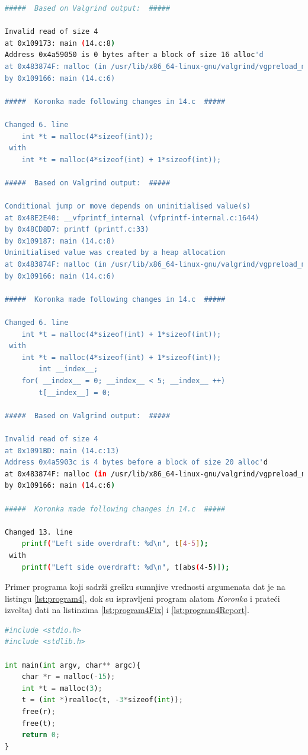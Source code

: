 \documentclass[12pt,oneside]{memoir}
\theoremstyle{plain}
\theoremstyle{definition}
\begin{document}
\begin{lstlisting}[style=terminal,caption={Izveštaj o radu alata \textit{Koronka} za program sa listinga \ref{lst:program3}}, label={lst:program3Report},language={bash}]   
#####  Based on Valgrind output:  #####

Invalid read of size 4
at 0x109173: main (14.c:8)
Address 0x4a59050 is 0 bytes after a block of size 16 alloc'd
at 0x483874F: malloc (in /usr/lib/x86_64-linux-gnu/valgrind/vgpreload_memcheck-amd64-linux.so)
by 0x109166: main (14.c:6)

#####  Koronka made following changes in 14.c  #####

Changed 6. line 
	int *t = malloc(4*sizeof(int));
 with 
	int *t = malloc(4*sizeof(int) + 1*sizeof(int));

#####  Based on Valgrind output:  #####

Conditional jump or move depends on uninitialised value(s)
at 0x48E2E40: __vfprintf_internal (vfprintf-internal.c:1644)
by 0x48CD8D7: printf (printf.c:33)
by 0x109187: main (14.c:8)
Uninitialised value was created by a heap allocation
at 0x483874F: malloc (in /usr/lib/x86_64-linux-gnu/valgrind/vgpreload_memcheck-amd64-linux.so)
by 0x109166: main (14.c:6)

#####  Koronka made following changes in 14.c  #####

Changed 6. line 
	int *t = malloc(4*sizeof(int) + 1*sizeof(int));
 with 
	int *t = malloc(4*sizeof(int) + 1*sizeof(int));
		int __index__;
	for( __index__ = 0; __index__ < 5; __index__ ++)
		t[__index__] = 0;

#####  Based on Valgrind output:  #####

Invalid read of size 4
at 0x1091BD: main (14.c:13)
Address 0x4a5903c is 4 bytes before a block of size 20 alloc'd
at 0x483874F: malloc (in /usr/lib/x86_64-linux-gnu/valgrind/vgpreload_memcheck-amd64-linux.so)
by 0x109166: main (14.c:6)

#####  Koronka made following changes in 14.c  #####

Changed 13. line 
	printf("Left side overdraft: %d\n", t[4-5]);
 with 
	printf("Left side overdraft: %d\n", t[abs(4-5)]);	
\end{lstlisting}

Primer programa koji sadrži grešku sumnjive vrednosti argumenata dat je na listingu \ref{lst:program4}, dok su ispravljeni program alatom \textit{Koronka} i prateći izveštaj dati na listinzima \ref{lst:program4Fix} i \ref{lst:program4Report}.

\begin{lstlisting}[style=mystyle,caption={Program koji sadrži grešku sumnjive vrednosti argumenata}, label={lst:program4},language={Python}] 
#include <stdio.h>
#include <stdlib.h>

int main(int argv, char** argc){
	char *r = malloc(-15);
	int *t = malloc(3);
	t = (int *)realloc(t, -3*sizeof(int)); 
	free(r);
	free(t);
	return 0;
}
\end{lstlisting}
\end{document}
